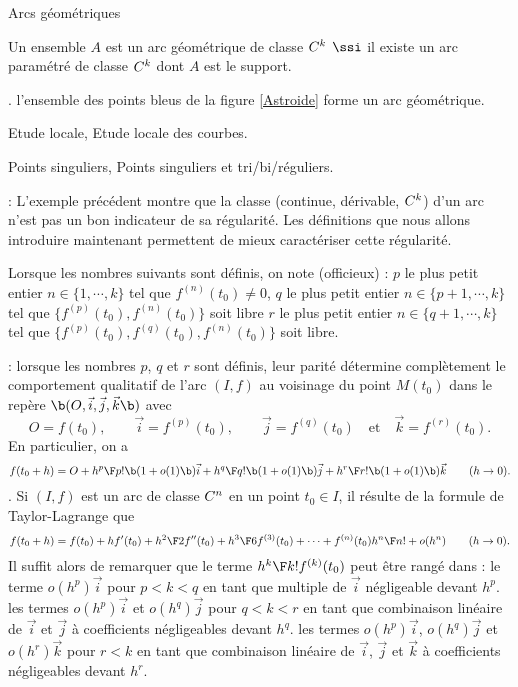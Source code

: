 \Concept Arcs géométriques

Un ensemble $A$ est un arc géométrique de classe $\sc C^k$ $\ssi$ il existe un arc paramétré de classe $\sc C^k$ dont $A$ est le support. 
\bigskip

\Exemple. l'ensemble des points bleus de la figure \ref{Astroide} forme un arc géométrique. 

\Section Etude locale, Etude locale des courbes. 

\Subsection Points singuliers, Points singuliers et tri/bi/réguliers.

\Remarque : L'exemple précédent montre que la classe (continue, dérivable, $\sc C^k$) d'un arc n'est pas un bon indicateur de sa régularité. 
Les définitions que nous allons introduire maintenant permettent de mieux caractériser cette régularité. 
\bigskip

Lorsque les nombres suivants sont définis, on note (officieux) : \medskip\noindent
$p$ le plus petit entier $n\in\{1,\cdots, k\}$ tel que $f^{(n)}(t_0)\neq 0$, 
\medskip
\noindent 
$q$ le plus petit entier $n\in\{p+1,\cdots,k\}$ tel que $\{f^{(p)}(t_0),f^{(n)}(t_0)\}$ soit libre 
\medskip
\noindent 
$r$ le plus petit entier $n\in\{q+1,\cdots,k\}$ tel que $\{f^{(p)}(t_0),f^{(q)}(t_0),f^{(n)}(t_0)\}$ soit libre. 

\Remarque : lorsque les nombres $p$, $q$ et $r$ sont définis, leur parité détermine complètement le comportement qualitatif de l'arc $(I,f)$ au voisinage du point $M(t_0)$ dans le repère $\b(O,\vec i,\vec j,\vec k\b)$ avec 
$$ 
O=f(t_0), \qquad \vec i=f^{(p)}(t_0), \qquad\vec j=f^{(q)}(t_0)\quad\mbox{et}\quad\vec k=f^{(r)}(t_0).
$$ 
En particulier, on a 
$$
f(t_0+h)=O+{h^p\F p!}\b(1+o(1)\b)\vec i+{h^q\F q!}\b(1+o(1)\b)\vec j
+{h^r\F r!}\b(1+o(1)\b)\vec k\qquad(h\to0).
$$ 
\Demonstration. Si $(I,f)$ est un arc de classe $\sc C^n$ en un point $t_0\in I$, il résulte de la formule de Taylor-Lagrange que 
$$
f(t_0+h)=f(t_0)+hf'(t_0)+{h^2\F2}f''(t_0)+{h^3\F6}f^{(3)}(t_0)+\cdots+f^{(n)}(t_0){h^n\F n!}+o(h^n)\qquad(h\to0). 
$$
Il suffit alors de remarquer que le terme ${h^k\F k!}f^{(k)}(t_0)$ peut être rangé dans : \smallskip\noindent
le terme $o(h^p)\vec i$ pour $p<k<q$ en tant que multiple de $\vec i$ négligeable devant $h^p$. \smallskip\noindent
les termes $o(h^p)\vec i$ et $o(h^q)\vec j$ pour $q<k<r$ en tant que combinaison linéaire de $\vec i$ et $\vec j$ à coefficients négligeables devant $h^q$. \smallskip\noindent
les termes $o(h^p)\vec i$, $o(h^q)\vec j$ et $o(h^r)\vec k$ pour $r<k$ en tant que combinaison linéaire de $\vec i$, $\vec j$ et $\vec k$ à coefficients négligeables devant $h^r$. 
\CQFD

